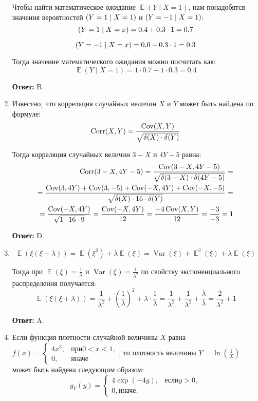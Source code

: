 \documentclass[a4paper]{article} %
\DeclareMathOperator{\cov}{Cov}
\DeclareMathOperator{\Var}{Var}
\DeclareMathOperator{\Corr}{Corr}
\DeclareMathOperator{\E}{\mathbb{E}}
\let\P\relax
\DeclareMathOperator{\P}{\mathbb{P}}
\begin{document}
\begin{enumerate}
    Чтобы найти математическое ожидание $\E(Y \mid X = 1)$, нам понадобятся значения вероятностей $\P(Y = 1 \mid X = 1)$ и $\P(Y = -1 \mid X = 1)$:
    \[
    \P(Y = 1 \mid X = x) = 0.4 + 0.3 \cdot 1 = 0.7
    \]
    
    \[
    \P(Y = -1 \mid X = x)  = 0.6 - 0.3 \cdot 1 = 0.3
    \]
    
    Тогда значение математического ожидания можно посчитать как:
    \[
    \E(Y \mid X = 1) = 1 \cdot 0.7 - 1 \cdot 0.3 = 0.4 
    \]
    
    \textbf{Ответ:} B.
    
    
    \item
    Известно, что корреляция случайных величин $X$ и $Y$ может быть найдена по формуле:
    \[
    \Corr(X, Y) = \frac{\cov(X, Y)}{\sqrt{\var(X) \cdot \var(Y)}}
    \]
    
    Тогда корреляция случайных величин $3 - X$ и $4Y - 5$ равна:
    \begin{align*}
    \Corr(3 - X, 4Y - 5) = \frac{\cov(3 - X, 4Y - 5)}{\sqrt{\var(3 - X) \cdot \var(4Y - 5)}} = \\
    = \frac{\cov(3, 4Y) + \cov(3, -5) + \cov(-X, 4Y) + \cov(-X, -5)}{\sqrt{\var(X) \cdot 16 \cdot \var(Y)}} = \\
    = \frac{\cov(-X, 4Y)}{\sqrt{1 \cdot 16 \cdot 9}} = \frac{\cov(-X, 4Y)}{12} = \frac{-4\cov(X, Y)}{12} = \frac{-3}{-3} = 1
    \end{align*}
    
    \textbf{Ответ:} D.
    
    
    \item
    
    \[
    \E(\xi(\xi + \lambda)) = \E(\xi^{2}) + \lambda\E(\xi) = \Var(\xi) + \E^{2}(\xi) + \lambda\E(\xi)
    \]
    
    Тогда при $\E(\xi) = \frac{1}{\lambda}$ и $\Var(\xi) = \frac{1}{\lambda^{2}}$ по свойству экспоненциального распределения получается:
    \[
    \E(\xi(\xi + \lambda)) = \frac{1}{\lambda^{2}} + \left( \frac{1}{\lambda} \right)^{2} + \lambda \cdot \frac{1}{\lambda} = \frac{1}{\lambda^{2}} + \frac{1}{\lambda^{2}} + \frac{\lambda}{\lambda} = \frac{2}{\lambda^{2}} + 1
    \]
    
    \textbf{Ответ:} A.
    
    
    \item
    
    Если функция плотности случайной величины $X$ равна
    $
    f(x) =
    \begin{cases}
    4x^{3}, & \text{при} 0 < x < 1, \\
    0, & \text{иначе}
    \end{cases}
    $,
    то плотность величины $Y = \ln(\frac{1}{X})$ может быть найдена следующим образом:
    \[
    g_{Y}(y) = 
    \begin{cases}
    4\exp(-4y), & \text{если} y > 0, \\
    0, \text{иначе}.
    \end{cases}
    \]
    

\end{enumerate}
\end{document}

